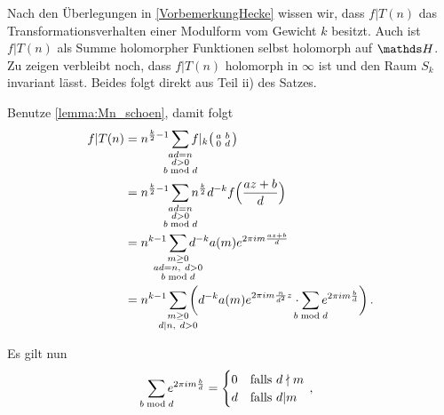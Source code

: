 \begin{bewe-list}
\item Nach den Überlegungen in \autoref{VorbemerkungHecke} wissen wir, dass $f | T(n)$ das Transformationsverhalten einer Modulform vom Gewicht $k$ besitzt. Auch ist $f | T(n)$ als Summe holomorpher Funktionen selbst holomorph auf $\HH$. Zu zeigen verbleibt noch, dass $f | T(n)$ holomorph in $\infty$ ist und den Raum $S_k$ invariant lässt. Beides folgt direkt aus Teil ii) des Satzes.

\item Benutze \autoref{lemma:Mn_schoen}, damit folgt
\begin{align*}
f|T(n)
&= n^{\frac{k}{2}-1} \smashoperator{\sum_{\substack{ad=n\\ d>0 \\ b\bmod d}}} f|_k \mymat ab0d \\
&= n^{\frac{k}{2}-1} \smashoperator{\sum_{\substack{ad=n\\ d>0 \\ b\bmod d}}} n^{\frac{k}{2}} d^{-k} f\Bigl(\frac{az+b}{d}\Bigr) \\
&= n^{k-1} \smashoperator{\sum_{\substack{m \geq 0\\ ad=n,\ d>0\\ b\bmod d}}} d^{-k} a(m) e^{2\pi im \frac{az+b}{d}} \\
&= n^{k-1} \smashoperator{\sum_{\substack{m \geq 0\\ d|n,\ d>0}}} \, \biggl( d^{-k} a(m) e^{2\pi im \frac{n}{d^2}z} \cdot \smashoperator{\sum_{b\bmod d}} e^{2\pi im \frac{b}{d}}\biggr)
\,.
\end{align*}

Es gilt nun
\[
\smashoperator{\sum_{b \bmod d}} e^{2\pi im \frac{b}{d}}
= \begin{cases}
0 & \text{falls } d\nmid m \\
d & \text{falls } d| m
\end{cases}
\,,
\]


\end{bewe-list}
